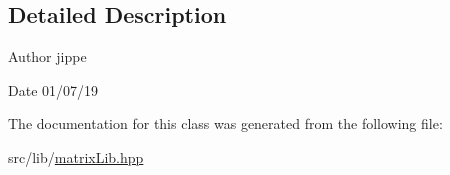 \subsection{Detailed Description}
\begin{DoxyAuthor}{Author}
jippe 
\end{DoxyAuthor}
\begin{DoxyDate}{Date}
01/07/19 
\end{DoxyDate}


The documentation for this class was generated from the following file\+:\begin{DoxyCompactItemize}
\item 
src/lib/\hyperlink{matrix_lib_8hpp}{matrix\+Lib.\+hpp}\end{DoxyCompactItemize}
